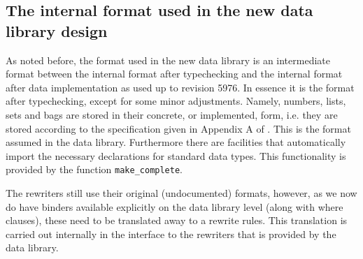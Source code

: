 \documentclass[a4paper,11pt]{article}
\begin{document}
\subsection{The internal format used in the new data library design}
\label{sec:new_data_format}
As noted before, the format used in the new data library is an intermediate format between the internal format after typechecking and the internal format after data implementation as used up to revision 5976. In essence it is the format after typechecking, except for some minor adjustments. Namely, numbers, lists, sets and bags are stored in their concrete, or implemented, form, i.e. they are stored according to the specification given in Appendix A of \cite{groote07dubs}. This is the format assumed in the data library. Furthermore there are facilities that automatically import the necessary declarations for standard data types. This functionality is provided by the function \texttt{make\_complete}.

The rewriters still use their original (undocumented) formats, however, as we now do have binders available explicitly on the data library level (along with where clauses), these need to be translated away to a rewrite rules. This translation is carried out internally in the interface to the rewriters that is provided by the data library.



%
%
%
\end{document}
